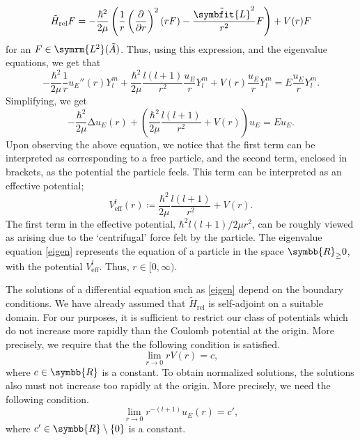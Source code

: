 \documentclass[12pt, a4 paper]{article}
\theoremstyle{definition}
\newcommand{\ltwo}{\symrm{L\kern-0.3pt^2}}
\newcommand{\rr}{\symbb{R}}
\newcommand{\lap}{∆}
\newcommand{\lvecsquare}{\tilde{\symbfit{L}}^2}
\newcommand{\hrel}{\tilde{H}_\text{rel}}
\newcommand{\ltwoa}{\ltwo(\tilde{A})}
\newcommand{\sphe}{Y_l^m}
\begin{document}
    \[
        \tilde{H}_\text{rel} F = -\frac{\hbar^2}{2\mu}\left(\frac{1}{r}\left(\frac{\partial}{\partial r}\right)^2 (rF) - \frac{\lvecsquare}{r^2}F\right) + V(r)F
    \]
    for an \(F \in \ltwoa\). Thus, using this expression, and the eigenvalue equations, we get that
    \[
        -\frac{\hbar^2}{2\mu} \frac{1}{r} u_E''(r) \sphe + \frac{\hbar^2}{2\mu} \frac{l(l+1)}{r^2} \frac{u_E}{r} \sphe + V(r) \frac{u_E}{r} \sphe = E \frac{u_E}{r} \sphe.
    \]
    Simplifying, we get
    \[
        -\frac{\hbar^2}{2\mu} \lap u_E(r) + \left(\frac{\hbar^2}{2\mu} \frac{l(l+1)}{r^2} + V(r)\right) u_E = E u_E.\tag{\textasteriskcentered}\label{eigen}
    \]
    Upon observing the above equation, we notice that the first term can be interpreted as corresponding to a free particle, and the second term, enclosed in brackets, as the potential the particle feels. This term can be interpreted as an effective potential;
    \[
        V^l_{\text{eff}} (r) \coloneq \frac{\hbar^2}{2\mu} \frac{l(l+1)}{r^2} + V(r).
    \]
    The first term in the effective potential, \(\hbar^2 l(l+1)/2\mu r^2\), can be roughly viewed as arising due to the `centrifugal' force felt by the particle. The eigenvalue equation \eqref{eigen} represents the equation of a particle in the space \(\rr_{\geq}0\), with the potential \(V^l_{\text{eff}}\). Thus, \(r \in [0, \infty)\).

    The solutions of a differential equation such as \eqref{eigen} depend on the boundary conditions. We have already assumed that \(\hrel\) is self-adjoint on a suitable domain. For our purposes, it is sufficient to restrict our class of potentials which do not increase more rapidly than the Coulomb potential at the origin. More precisely, we require that the the following condition is satisfied.
    \[
        \lim_{r \rightarrow 0} rV(r) = c,
    \]
    where \(c \in \rr\) is a constant. To obtain normalized solutions, the solutions also must not increase too rapidly at the origin. More precisely, we need the following condition.
    \[
        \lim_{r \rightarrow 0} r^{-(l+1)} u_E(r) = c',
    \]
    where \(c' \in \rr\setminus\{0\}\) is a constant.

    \nocite{*}
    \printbibliography[heading=bibintoc]
    \printindex
\end{document}
